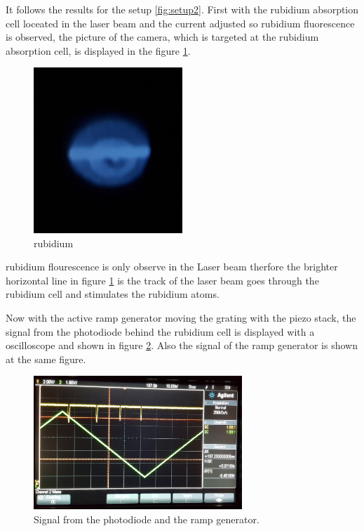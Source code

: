 It follows the results for the setup \ref{fig:setup2}.
First with the rubidium absorption cell loceated in the laser beam
and the current adjusted so rubidium fluorescence is observed, the picture of the
camera, which is targeted at the
rubidium absorption cell, is
displayed in the figure \ref{fig:Floures}.

\begin{figure}
  \centering
  \includegraphics[width = 0.5\textwidth]{figures/Rb_leuchten.jpg}
  \caption{rubidium }
  \label{fig:Floures}
\end{figure}

rubidium flourescence is only observe in the Laser beam therfore
the brighter horizontal line
in figure \ref{fig:Floures}
is the track of the laser beam
goes through the rubidium cell and stimulates the rubidium atoms.

Now with the active ramp generator moving the grating with the piezo stack,
the signal from the photodiode behind the rubidium cell
is displayed with a
oscilloscope and shown in figure \ref{fig:ramp}.
Also the signal of the ramp generator is shown at the same
figure.

\begin{figure}
  \centering
  \includegraphics[width = 0.7\textwidth]{figures/Ramp.jpg}
  \caption{Signal from the photodiode and the ramp generator.}
  \label{fig:ramp}
\end{figure}

